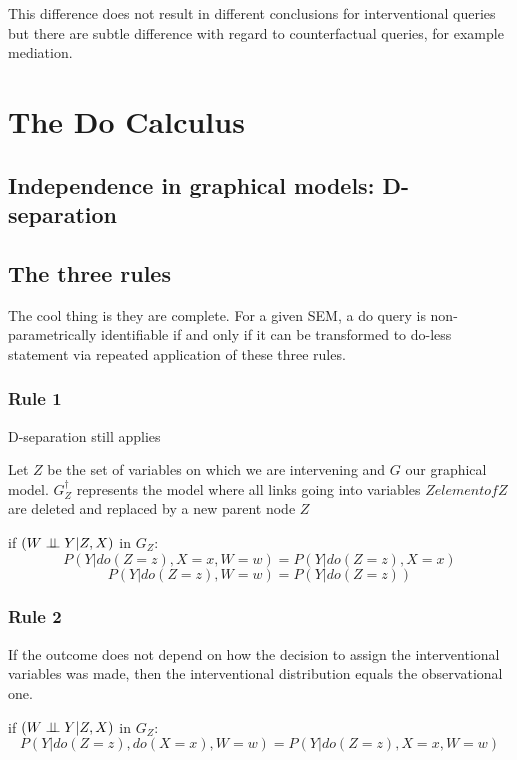 \documentclass[11pt,a4paper]{article}
\begin{document}
This difference does not result in different conclusions for interventional queries but there are subtle difference with regard to counterfactual queries, for example mediation. 


\section{The Do Calculus}
\subsection{Independence in graphical models: D-separation}

\subsection{The three rules}
The cool thing is they are complete. For a given SEM, a do query is non-parametrically identifiable if and only if it can be transformed to do-less statement via repeated application of these three rules. 
\subsubsection{Rule 1}
D-separation still applies

Let $Z$ be the set of variables on which we are intervening and $G$ our graphical model. $G^{\dag}_{Z}$ represents the model where all links going into variables $Z elementof Z$ are deleted and replaced by a new parent node $Z$


if $(W \perp\!\!\!\perp Y | Z,X)$ in $G_{Z}$:
\begin{equation}
\label{eq:Do1}
 P(Y|do(Z=z),X=x,W=w) = P(Y|do(Z=z),X=x) 
\end{equation}
\begin{equation}
\label{eq:Do12}
 P(Y|do(Z=z),W=w) = P(Y|do(Z=z)) 
\end{equation}

\subsubsection{Rule 2}
If the outcome does not depend on how the decision to assign the interventional variables was made, then the interventional distribution equals the observational one. 

if $(W \perp\!\!\!\perp Y | Z,X)$ in $G_{Z}$:
\begin{equation}
\label{eq:Do2}
P(Y|do(Z=z),do(X=x),W=w) = P(Y|do(Z=z),X=x,W=w)
\end{equation}
\end{document}
